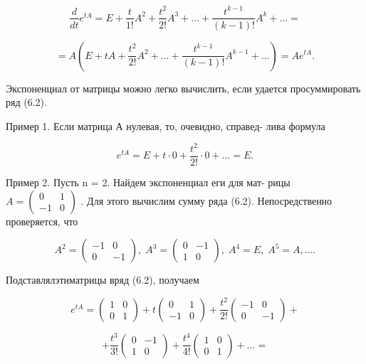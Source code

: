 \documentclass[8pt]{extarticle}
\begin{document}
\[
\frac{d}{dt}{e}^{tA} = E + \frac{t}{1!}{A}^{2} + \frac{{t}^{2}}{2!}{A}^{3} + \ldots  + \frac{{t}^{k - 1}}{\left( {k - 1}\right) !}{A}^{k} + \ldots  =
\]

\[
= A\left( {E + {tA} + \frac{{t}^{2}}{2!}{A}^{2} + \ldots  + \frac{{t}^{k - 1}}{\left( {k - 1}\right) !}{A}^{k - 1} + \ldots }\right)  = A{e}^{tA}. \tag{6.5}
\]

Экспоненциал от матрицы можно легко вычислить, если удается просуммировать ряд (6.2).

Пример 1. Если матрица А нулевая, то, очевидно, справед- лива формула

\[
{e}^{tA} = E + t \cdot  0 + \frac{{t}^{2}}{2!} \cdot  0 + \ldots  = E.
\]

Пример 2. Пусть n = 2. Найдем экспоненциал еги для мат- рицы \(A = \left( \begin{array}{rr} 0 & 1 \\   - 1 & 0 \end{array}\right)\) . Для этого вычислим сумму ряда (6.2). Непосредственно проверяется, что

\[
{A}^{2} = \left( \begin{array}{cc} - 1 & 0 \\  0 &  - 1 \end{array}\right) ,\;{A}^{3} = \left( \begin{array}{cc} 0 &  - 1 \\  1 & 0 \end{array}\right) ,\;{A}^{4} = E,\;{A}^{5} = A,\ldots .
\]

Подставлялэтиматрицы вряд (6.2), получаем

\[
{e}^{tA} = \left( \begin{array}{ll} 1 & 0 \\  0 & 1 \end{array}\right)  + t\left( \begin{array}{cc} 0 & 1 \\   - 1 & 0 \end{array}\right)  + \frac{{t}^{2}}{2!}\left( \begin{array}{cc} - 1 & 0 \\  0 &  - 1 \end{array}\right)  +
\]

\[
+ \frac{{t}^{3}}{3!}\left( \begin{array}{cc} 0 &  - 1 \\  1 & 0 \end{array}\right)  + \frac{{t}^{4}}{4!}\left( \begin{array}{ll} 1 & 0 \\  0 & 1 \end{array}\right)  + \ldots  =
\]
\end{document}
